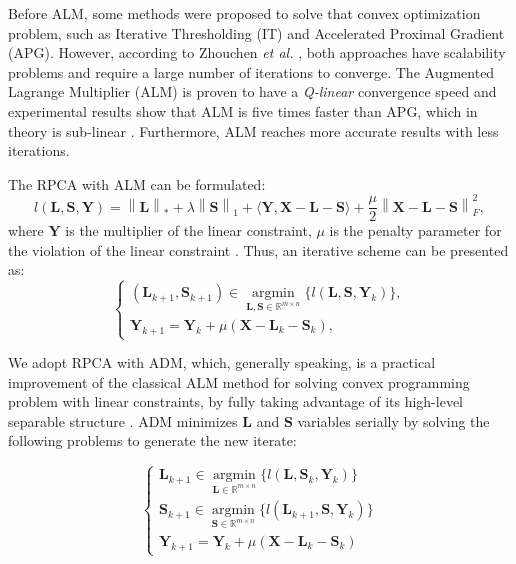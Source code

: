 Before ALM, some methods were proposed to solve that convex optimization problem, such as Iterative Thresholding (IT) and Accelerated Proximal Gradient (APG). However, according to Zhouchen \emph{et al.} \cite{lin2010augmented}, both approaches have scalability problems and require a large number of iterations to converge. The Augmented Lagrange Multiplier (ALM) is proven to have a \emph{Q-linear} convergence speed and experimental results show that ALM is five times faster than APG, which in theory is sub-linear \cite{lin2010augmented}. Furthermore, ALM reaches more accurate results with less iterations.

The RPCA with ALM can be formulated:
\begin{equation}\label{eq:4.04}
	l(\pmb{L}, \pmb{S}, \pmb{Y}) = \left\|\pmb{L}\right\|_* + \lambda\left\|\pmb{S}\right\|_1 + \langle \pmb{Y}, \pmb{X} - \pmb{L} - \pmb{S}  \rangle + \frac{\mu}{2}\left\|\pmb{X} - \pmb{L} - \pmb{S}\right\|_F^2,
\end{equation}
where $\pmb{Y}$ is the multiplier of the linear constraint, $\mu$ is the penalty parameter for the violation of the linear constraint \cite{yuan2009sparse}. Thus, an iterative scheme can be presented as:
\begin{equation}\label{eq:4.05}
	\left\{
		\begin{matrix} 
			(\pmb{L}_{k+1}, \pmb{S}_{k+1}) \in \operatorname*{argmin}_{\pmb{L,S} \in \mathbb{R}^{m \times n}} \{l(\pmb{L}, \pmb{S}, \pmb{Y}_{k})\}, \\ 
			\pmb{Y}_{k+1} = \pmb{Y}_{k} + \mu(\pmb{X} - \pmb{L}_{k} - \pmb{S}_{k}),
		\end{matrix}
	\right.
\end{equation}

We adopt RPCA with ADM, which, generally speaking, is a practical improvement of the classical ALM method for solving convex programming problem with linear constraints, by fully taking advantage of its high-level separable structure \cite{yuan2009sparse}. ADM minimizes $\pmb{L}$ and $\pmb{S}$ variables serially by solving the following problems to generate the new iterate:

\begin{equation}\label{eq:4.06}
	\left\{\begin{matrix}
	\pmb{L}_{k+1} \in \operatorname*{argmin}_{\pmb{L} \in \mathbb{R}^{m \times n}}\{l(\pmb{L}, \pmb{S}_{k}, \pmb{Y}_{k})\}\\ 
	\pmb{S}_{k+1} \in \operatorname*{argmin}_{\pmb{S} \in \mathbb{R}^{m \times n}}\{l(\pmb{L}_{k+1}, \pmb{S}, \pmb{Y}_{k})\}\\ 
	\pmb{Y}_{k+1} = \pmb{Y}_{k} + \mu(\pmb{X} - \pmb{L}_{k} - \pmb{S}_{k})
	\end{matrix}\right.
\end{equation}

